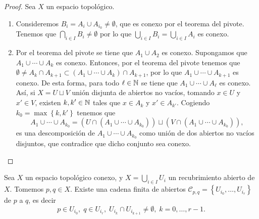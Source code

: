 \begin{proof}
Sea $\displaystyle X $ un espacio topológico.
\begin{enumerate}
\item Consideremos $\displaystyle B_{i}=A_{i}\cup A_{i_{0}} \neq \emptyset $, que es conexo por el teorema del pivote. Tenemos que $\displaystyle \bigcap_{ i \in I}B_{i}\neq \emptyset $ por lo que $\displaystyle \bigcup_{i \in I}B_{i}=\bigcup_{i \in I}A_{i} $ es conexo. 
\item Por el teorema del pivote se tiene que $\displaystyle A_{1} \cup A_{2}  $ es conexo. Supongamos que $\displaystyle A_{1} \cup \cdots \cup A_{k} $ es conexo. Entonces, por el teorema del pivote tenemos que $\displaystyle \emptyset \neq A_{k}\cap A_{k+1}\subset \left(A_{1}\cup \cdots \cup A_{k}\right)\cap A_{k+1} $, por lo que $\displaystyle A_{1} \cup \cdots \cup A_{k + 1} $ es conexo. 
	De esta forma, para todo $\displaystyle \ell \in \mathbb{N} $ se tiene que $\displaystyle A_{1} \cup \cdots \cup A_{\ell} $ es conexo. \\
	Así, si $\displaystyle X = U \sqcup V $ unión disjunta de abiertos no vacíos, tomando $\displaystyle x \in U $ y $\displaystyle x' \in V $, existen $\displaystyle k,k'\in \mathbb{N} $ tales que $\displaystyle x\in A_{k} $ y $\displaystyle x'\in A_{k'} $. Cogiendo $\displaystyle k_{0}=\max \left\{ k,k'\right\}  $ tenemos que 
	\[A_{1} \cup \cdots \cup A_{k_{0}}=\left(U \cap \left(A_{1} \cup \cdots \cup A_{k_{0}}\right)\right)\sqcup \left(V \cap \left(A_{1} \cup \cdots \cup A_{k_{0}}\right)\right) ,\]
	es una descomposición de $\displaystyle A_{1} \cup \cdots \cup A_{k_{0}} $ como unión de dos abiertos no vacíos disjuntos, que contradice que dicho conjunto sea conexo. 
\end{enumerate}
\end{proof}
\begin{prop}
	Sea $\displaystyle X $ un espacio topológico conexo, y $\displaystyle X = \bigcup_{i \in I}U_{i} $ un recubrimiento abierto de $\displaystyle X $. Tomemos $\displaystyle p,q \in X $. Existe una cadena finita de abiertos $\displaystyle \mathcal{C}_{p,q}= \left\{ U_{i_{0}}, \ldots, U_{i_{r}}\right\}  $ de $\displaystyle p $ a $\displaystyle q $, es decir
	\[p \in U_{i_{0}}, \; q \in U_{i_{r}}, \; U_{i_{k}}\cap U_{i_{k+1}}\neq \emptyset, \; k = 0, \ldots, r-1 .\]
\end{prop}
